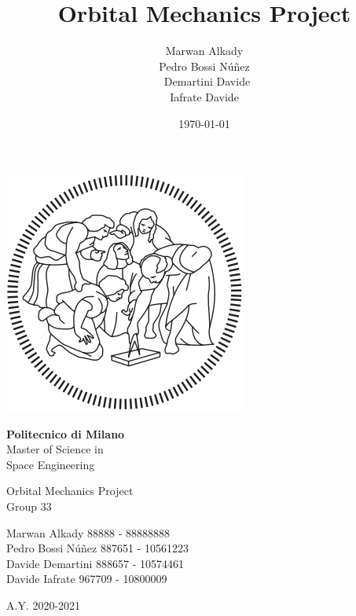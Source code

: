 \documentclass[11pt,a4paper]{report}
\title{Orbital Mechanics Project}
\author{Marwan Alkady\\ Pedro Bossi N\'{u}\~{n}ez \\\ Demartini Davide\\ Iafrate Davide\\}
\date{\today}
\begin{document}
\begin{titlepage}
	\clearpage\thispagestyle{empty}
	\centering


   \centering \includegraphics[scale=0.7]{logo}

   \vspace{0.5cm}

	{\Huge\textbf{Politecnico di Milano} \\
Master of Science in\\ Space Engineering \\
		 \par}
		\vspace{3cm}
	{\Huge{Orbital Mechanics Project}} \\
	\vspace{3cm}
	{\huge Group 33\\}
	\vspace{0.4cm}
	{\LARGE Marwan Alkady 88888 - 88888888\\ Pedro Bossi N\'{u}\~{n}ez 887651 - 10561223\\ Davide Demartini 888657 - 10574461\\ Davide Iafrate 967709 - 10800009\\ \par}

\vspace{1cm}
	{\Large A.Y. 2020-2021 \par}

	\pagebreak

\end{titlepage}
\end{document}
